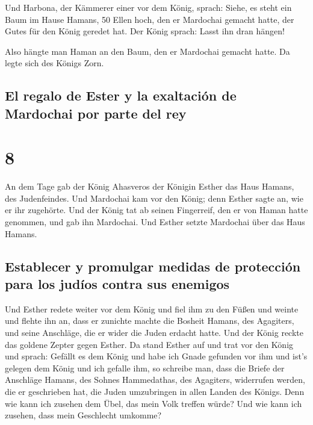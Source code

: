  Und Harbona, der Kämmerer einer vor dem König, sprach:
Siehe, es steht ein Baum im Hause Hamans, 50 Ellen hoch, den er
Mardochai gemacht hatte, der Gutes für den König geredet hat. Der König
sprach: Lasst ihn dran hängen!

 Also hängte man Haman an den Baum, den er Mardochai
gemacht hatte. Da legte sich des Königs Zorn.

\hypertarget{el-regalo-de-ester-y-la-exaltaciuxf3n-de-mardochai-por-parte-del-rey}{%
\subsection{El regalo de Ester y la exaltación de Mardochai por parte
del
rey}\label{el-regalo-de-ester-y-la-exaltaciuxf3n-de-mardochai-por-parte-del-rey}}

\hypertarget{section-7}{%
\section{8}\label{section-7}}

 An dem Tage gab der König Ahasveros der Königin Esther
das Haus Hamans, des Judenfeindes. Und Mardochai kam vor den König; denn
Esther sagte an, wie er ihr zugehörte.  Und der König tat
ab seinen Fingerreif, den er von Haman hatte genommen, und gab ihn
Mardochai. Und Esther setzte Mardochai über das Haus Hamans.

\hypertarget{establecer-y-promulgar-medidas-de-protecciuxf3n-para-los-juduxedos-contra-sus-enemigos}{%
\subsection{Establecer y promulgar medidas de protección para los judíos
contra sus
enemigos}\label{establecer-y-promulgar-medidas-de-protecciuxf3n-para-los-juduxedos-contra-sus-enemigos}}

 Und Esther redete weiter vor dem König und fiel ihm zu
den Füßen und weinte und flehte ihn an, dass er zunichte machte die
Bosheit Hamans, des Agagiters, und seine Anschläge, die er wider die
Juden erdacht hatte.  Und der König reckte das goldene
Zepter gegen Esther. Da stand Esther auf und trat vor den König
 und sprach: Gefällt es dem König und habe ich Gnade
gefunden vor ihm und ist's gelegen dem König und ich gefalle ihm, so
schreibe man, dass die Briefe der Anschläge Hamans, des Sohnes
Hammedathas, des Agagiters, widerrufen werden, die er geschrieben hat,
die Juden umzubringen in allen Landen des Königs.  Denn
wie kann ich zusehen dem Übel, das mein Volk treffen würde? Und wie kann
ich zusehen, dass mein Geschlecht umkomme?

